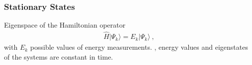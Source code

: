 \documentclass[letterpaper,10pt,english]{jupyterBook}
\begin{document}
\subsubsection{Stationary States}
\label{\detokenize{ch/quantum-mechanics/intro:stationary-states}}
\sphinxAtStartPar
Eigenspace of the Hamiltonian operator
\begin{equation*}
\begin{split}\hat{H} |\Psi_k \rangle = E_k |\Psi_k \rangle \ ,\end{split}
\end{equation*}
\sphinxAtStartPar
with \(E_k\) possible values of energy measurements. 
  , energy values and eigenstates of the systems are constant in time.
\end{document}
